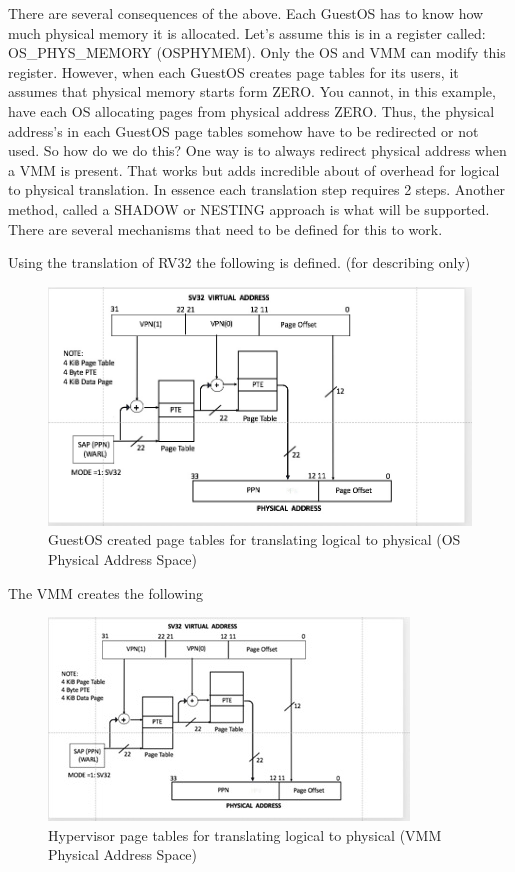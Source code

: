 \documentclass{article}
\begin{document}
There are several consequences of the above.  Each GuestOS has to know how much physical memory it is allocated.  Let’s assume this is in a register called:  OS\_PHYS\_MEMORY (OSPHYMEM).   Only the OS and VMM can modify this register.  However, when each GuestOS creates page tables for its users,  it assumes that physical memory starts form ZERO.  You cannot, in this example,  have each OS allocating pages from physical address ZERO. Thus, the physical address’s in each GuestOS page tables  somehow have to be redirected or not used. So how do we do this? One way is to always redirect physical address when a VMM is present.  That works but adds incredible about of overhead for logical to physical translation.  In essence each translation step requires 2 steps.  Another  method,   called a SHADOW or NESTING approach is what will be supported.  There are several mechanisms that need to be defined for this to work.

Using the translation of RV32 the following is defined. (for describing only)

\begin{figure}
\begin{center}
\includegraphics[scale = .4]
{figures/figure7_rv32_pte.jpg}
\caption{GuestOS created page tables for translating logical to  physical (OS Physical Address Space)\label{fig:guest-logical-physical}}
\end{center}
\end{figure}


The VMM creates the following


\begin{figure}
\begin{center}
\includegraphics[scale = .9]
{figures/figure8_hypervisor_page_table.jpg}
\caption{Hypervisor  page tables for translating logical to physical (VMM Physical Address Space)}
\label{fig:hypervisor pagetables}
\end{center}
\end{figure}
\end{document}
